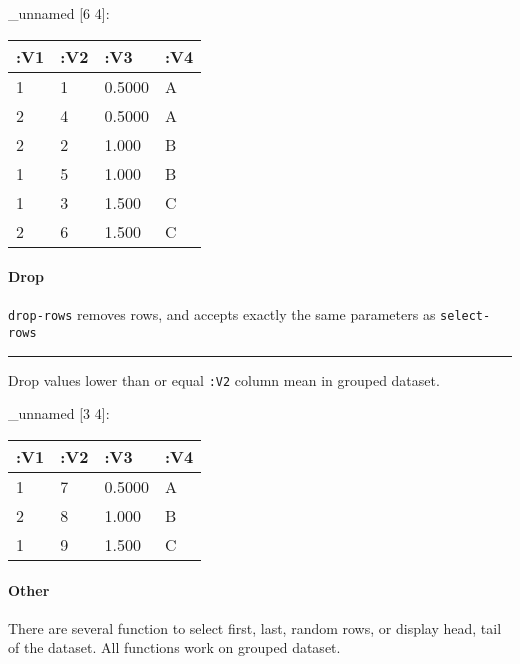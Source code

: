 \documentclass[]{article}
\newenvironment{Shaded}{\begin{snugshade}}{\end{snugshade}}
\newcommand{\KeywordTok}[1]{\textcolor[rgb]{0.13,0.29,0.53}{\textbf{#1}}}
\newcommand{\VariableTok}[1]{\textcolor[rgb]{0.00,0.00,0.00}{#1}}
\newcommand{\AttributeTok}[1]{\textcolor[rgb]{0.77,0.63,0.00}{#1}}
\newcommand{\NormalTok}[1]{#1}
\let\oldparagraph\paragraph
\renewcommand{\paragraph}[1]{\oldparagraph{#1}\mbox{}}
\begin{document}
\_unnamed {[}6 4{]}:

\begin{longtable}[]{@{}llll@{}}
\toprule
:V1 & :V2 & :V3 & :V4\tabularnewline
\midrule
\endhead
1 & 1 & 0.5000 & A\tabularnewline
2 & 4 & 0.5000 & A\tabularnewline
2 & 2 & 1.000 & B\tabularnewline
1 & 5 & 1.000 & B\tabularnewline
1 & 3 & 1.500 & C\tabularnewline
2 & 6 & 1.500 & C\tabularnewline
\bottomrule
\end{longtable}

\paragraph{Drop}\label{drop-1}

\texttt{drop-rows} removes rows, and accepts exactly the same parameters
as \texttt{select-rows}

\begin{center}\rule{0.5\linewidth}{0.5pt}\end{center}

Drop values lower than or equal \texttt{:V2} column mean in grouped
dataset.

\begin{Shaded}
\end{Shaded}

\_unnamed {[}3 4{]}:

\begin{longtable}[]{@{}llll@{}}
\toprule
:V1 & :V2 & :V3 & :V4\tabularnewline
\midrule
\endhead
1 & 7 & 0.5000 & A\tabularnewline
2 & 8 & 1.000 & B\tabularnewline
1 & 9 & 1.500 & C\tabularnewline
\bottomrule
\end{longtable}

\paragraph{Other}\label{other}

There are several function to select first, last, random rows, or
display head, tail of the dataset. All functions work on grouped
dataset.
\end{document}
